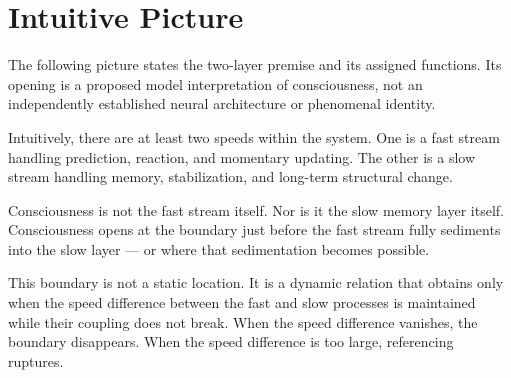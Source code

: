 \section{Intuitive Picture}

The following picture states the two-layer premise and its assigned functions. Its opening is a proposed model interpretation of consciousness, not an independently established neural architecture or phenomenal identity.


Intuitively, there are at least two speeds within the system. One is a fast stream handling prediction, reaction, and momentary updating. The other is a slow stream handling memory, stabilization, and long-term structural change.

Consciousness is not the fast stream itself. Nor is it the slow memory layer itself. Consciousness opens at the boundary just before the fast stream fully sediments into the slow layer — or where that sedimentation becomes possible.

This boundary is not a static location. It is a dynamic relation that obtains only when the speed difference between the fast and slow processes is maintained while their coupling does not break. When the speed difference vanishes, the boundary disappears. When the speed difference is too large, referencing ruptures.
